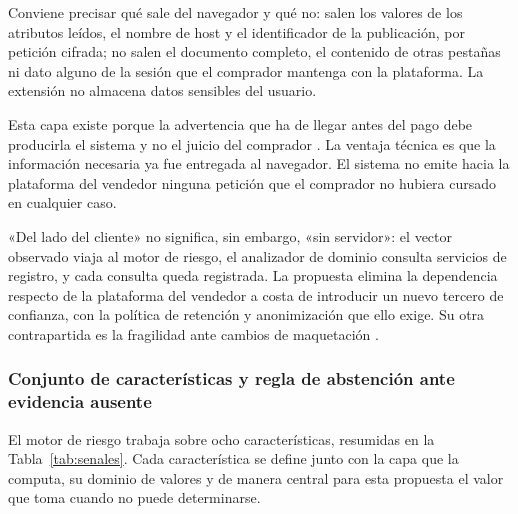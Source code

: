 Conviene precisar qué sale del navegador y qué no: salen los valores de los atributos leídos,
el nombre de host y el identificador de la publicación, por petición cifrada; no salen el
documento completo, el contenido de otras pestañas ni dato alguno de la sesión que el
comprador mantenga con la plataforma. La extensión no almacena datos sensibles del usuario.

Esta capa existe porque la advertencia que ha de llegar antes del pago debe producirla el
sistema y no el juicio del comprador \cite{ref27, ref3}. La ventaja técnica es que la
información necesaria ya fue entregada al navegador. El sistema no emite hacia la plataforma
del vendedor ninguna petición que el comprador no hubiera cursado en cualquier caso.

«Del lado del cliente» no significa, sin embargo, «sin servidor»: el vector observado viaja al
motor de riesgo, el analizador de dominio consulta servicios de registro, y cada consulta
queda registrada. La propuesta elimina la dependencia respecto de la plataforma del vendedor
a costa de introducir un nuevo tercero de confianza, con la política de retención y
anonimización que ello exige. Su otra contrapartida es la fragilidad ante cambios de
maquetación \cite{ref24}.

\subsubsection{Conjunto de características y regla de abstención ante evidencia ausente}

El motor de riesgo trabaja sobre ocho características, resumidas en la Tabla~\ref{tab:senales}.
Cada característica se define junto con la capa que la computa, su dominio de valores y   de
manera central para esta propuesta   el valor que toma cuando no puede determinarse.

